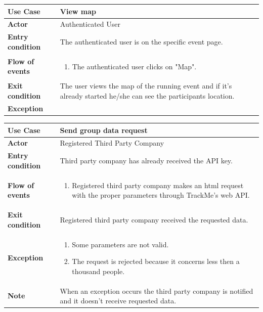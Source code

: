 \documentclass[../main.tex]{subfiles}
\begin{document}
	\vspace*{3cm}
	\begin{center}
		\begin{tabular}{p{3cm}p{8.28cm}}
			\hline
			\textbf{Use Case} & View map\\
			\hline
			\textbf{Actor} & Authenticated User\\
			\hline
			\textbf{Entry condition} & The authenticated user is on the specific event page.\\
			\hline
			\textbf{Flow of events} & \begin{enumerate}
				\linespread{0}\item The authenticated user clicks on "Map".
			\end{enumerate}\\
			\hline
			\textbf{Exit condition} & The user views the map of the running event and if it's already started he/she can see the participants location.\\
			\hline
			\textbf{Exception}\\
			\hline
		\end{tabular}
	\end{center}
	\vspace*{3cm}
	\begin{center}
		\begin{tabular}{p{3cm}p{8.28cm}}
			\hline
			\textbf{Use Case} & Send group data request\\
			\hline
			\textbf{Actor} & Registered Third Party Company\\
			\hline
			\textbf{Entry condition} & Third party company has already received the API key.\\
			\hline
			\textbf{Flow of events} & \begin{enumerate}
				\linespread{0}\item Registered third party company makes an html request with the proper parameters through TrackMe's web API.
			\end{enumerate}\\
			\hline
			\textbf{Exit condition} & Registered third party company received the requested data.\\
			\hline
			\textbf{Exception} & \begin{enumerate}
				\linespread{0}\item Some parameters are not valid.
				\linespread{0}\item The request is rejected because it concerns less then a thousand people.
			\end{enumerate}\\
			\hline
			\textbf{Note} & When an exception occurs the third party company is notified and it doesn't receive requested data. \\
			\hline
		\end{tabular}
	\end{center}
\end{document}

